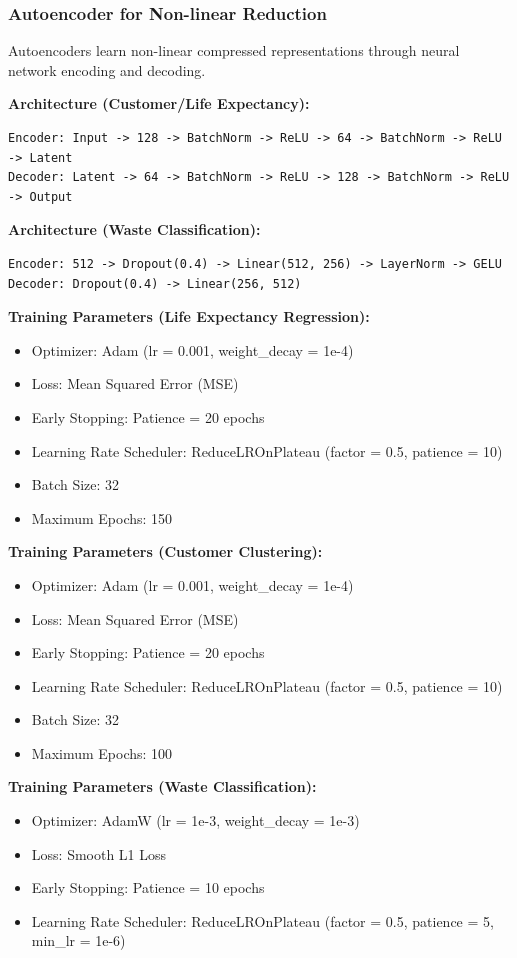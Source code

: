 \documentclass[11pt,a4paper]{article}
\begin{document}
\subsubsection{Autoencoder for Non-linear Reduction}

Autoencoders learn non-linear compressed representations through neural network encoding and decoding.

\textbf{Architecture (Customer/Life Expectancy):}
\begin{verbatim}
Encoder: Input -> 128 -> BatchNorm -> ReLU -> 64 -> BatchNorm -> ReLU -> Latent
Decoder: Latent -> 64 -> BatchNorm -> ReLU -> 128 -> BatchNorm -> ReLU -> Output
\end{verbatim}

\textbf{Architecture (Waste Classification):}
\begin{verbatim}
Encoder: 512 -> Dropout(0.4) -> Linear(512, 256) -> LayerNorm -> GELU
Decoder: Dropout(0.4) -> Linear(256, 512)
\end{verbatim}

\textbf{Training Parameters (Life Expectancy Regression):}
\begin{itemize}
    \item Optimizer: Adam (lr = 0.001, weight\_decay = 1e-4)
    \item Loss: Mean Squared Error (MSE)
    \item Early Stopping: Patience = 20 epochs
    \item Learning Rate Scheduler: ReduceLROnPlateau (factor = 0.5, patience = 10)
    \item Batch Size: 32
    \item Maximum Epochs: 150
\end{itemize}

\textbf{Training Parameters (Customer Clustering):}
\begin{itemize}
    \item Optimizer: Adam (lr = 0.001, weight\_decay = 1e-4)
    \item Loss: Mean Squared Error (MSE)
    \item Early Stopping: Patience = 20 epochs
    \item Learning Rate Scheduler: ReduceLROnPlateau (factor = 0.5, patience = 10)
    \item Batch Size: 32
    \item Maximum Epochs: 100
\end{itemize}

\textbf{Training Parameters (Waste Classification):}
\begin{itemize}
    \item Optimizer: AdamW (lr = 1e-3, weight\_decay = 1e-3)
    \item Loss: Smooth L1 Loss
    \item Early Stopping: Patience = 10 epochs
    \item Learning Rate Scheduler: ReduceLROnPlateau (factor = 0.5, patience = 5, min\_lr = 1e-6)
\end{itemize}
\end{document}
